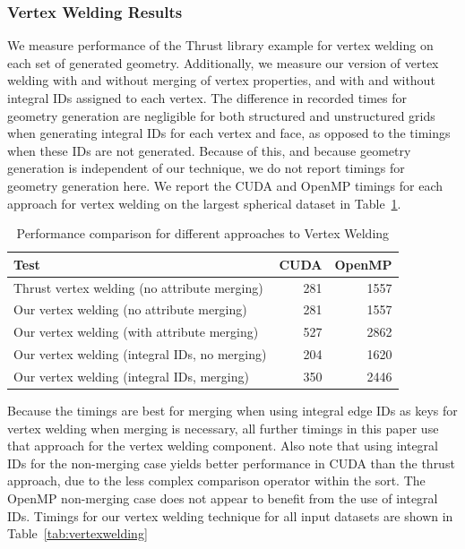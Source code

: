 \documentclass[journal]{vgtc}                %
\begin{document}
\subsubsection{Vertex Welding Results}
We measure performance of the Thrust library example for vertex welding on each set of generated geometry. Additionally, we measure our version of vertex welding with and without merging of vertex properties, and with and without integral IDs assigned to each vertex. The difference in recorded times for geometry generation are negligible for both structured and unstructured grids when generating integral IDs for each vertex and face, as opposed to the timings when these IDs are not generated. Because of this, and because geometry generation is independent of our technique, we do not report timings for geometry generation here. We report the CUDA and OpenMP timings for each approach for vertex welding on the largest spherical dataset in Table~\ref{tab:welding}.

\begin{table}[h!]
\begin{center}
\begin{tabular}{l r r}
Test & CUDA & OpenMP  \\
\hline
Thrust vertex welding (no attribute merging) & 281 & 1557 \\
Our vertex welding (no attribute merging) & 281 & 1557 \\
Our vertex welding (with attribute merging) & 527 & 2862\\
Our vertex welding (integral IDs, no merging) & 204 & 1620 \\
Our vertex welding (integral IDs, merging) & 350 & 2446 \\
\end{tabular}
\caption{Performance comparison for different approaches to Vertex Welding}
\label{tab:welding}
\end{center}
\end{table}

Because the timings are best for merging when using integral edge IDs as keys for vertex welding when merging is necessary, all further timings in this paper use that approach for the vertex welding component. Also note that using integral IDs for the non-merging case yields better performance in CUDA than the thrust approach, due to the less complex comparison operator within the sort. The OpenMP non-merging case does not appear to benefit from the use of integral IDs. Timings for our vertex welding technique for all input datasets are shown in Table~\ref{tab:vertexwelding}
\end{document}
